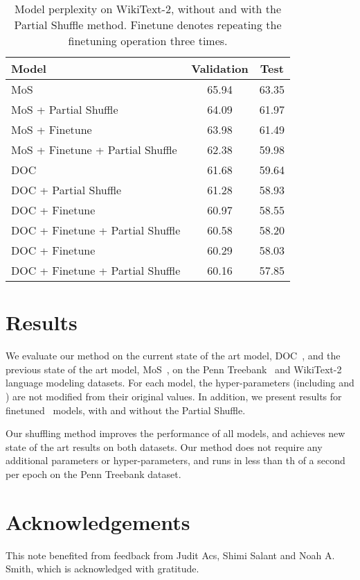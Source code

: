 \documentclass[11pt,a4paper]{article}
\begin{document}
\begin{table}[t!]
\begin{center}
{\small

\begin{tabular}{@{}lcc@{}}
\toprule
Model                                & Validation & Test  \\ \midrule
MoS                                  & 65.94      & 63.35 \\
MoS + Partial Shuffle              & 64.09      & 61.97 \\
MoS + Finetune                       & 63.98      & 61.49 \\
MoS + Finetune + Partial Shuffle   & 62.38      & 59.98 \\ \midrule
DOC                                  & 61.68      & 59.64 \\
DOC + Partial Shuffle              & 61.28      & 58.93 \\
DOC + Finetune                       & 60.97      & 58.55 \\
DOC + Finetune + Partial Shuffle   & 60.58      & 58.20  \\
DOC + Finetune                     &    60.29        &   58.03    \\
DOC + Finetune + Partial Shuffle &  60.16         &  57.85     \\ \bottomrule
\end{tabular} }

\end{center}
\caption{\label{PTB} Model perplexity on WikiText-2, without and with the Partial Shuffle method. Finetune denotes repeating the finetuning operation three times. }
\end{table}

\section{Results}
We evaluate our method on the current state of the art model, DOC~\cite{doc}, and the previous state of the art model, MoS~\cite{mos}, on the Penn Treebank~\cite{ptb} and WikiText-2~\cite{wt2} language modeling datasets. For each model, the hyper-parameters (including  and ) are not modified from their original values. In addition, we present results for finetuned~\cite{awd} models, with and without the Partial Shuffle. 

Our shuffling method improves the performance of all models, and achieves new state of the art results on both datasets. Our method does not require any additional parameters or hyper-parameters, and runs in less than th of a second per epoch on the Penn Treebank dataset.

\section{Acknowledgements}
This note benefited from feedback from Judit Acs, Shimi Salant and Noah A. Smith, which is acknowledged with gratitude. 




\end{document}
